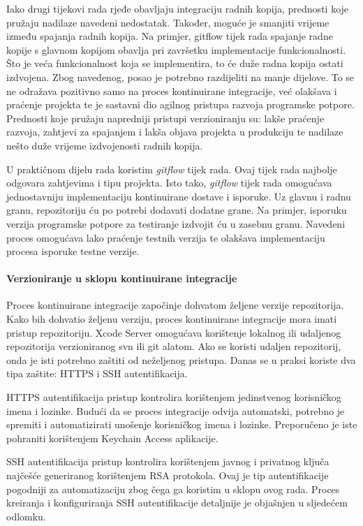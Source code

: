 \documentclass[times, utf8, diplomski, numeric]{fer}
\begin{document}
Iako drugi tijekovi rada rjeđe obavljaju integraciju radnih kopija, prednosti koje pružaju nadilaze navedeni nedostatak. Također, moguće je smanjiti vrijeme između spajanja radnih kopija. Na primjer, gitflow tijek rada spajanje radne kopije s glavnom kopijom obavlja pri završetku implementacije funkcionalnosti. Što je veća funkcionalnost koja se implementira, to će duže radna kopija ostati izdvojena. Zbog navedenog, posao je potrebno razdijeliti na manje dijelove. To se ne odražava pozitivno samo na proces kontinuirane integracije, već olakšava i praćenje projekta te je sastavni dio agilnog pristupa razvoja programske potpore. Prednosti koje pružaju napredniji pristupi verzioniranju su: lakše praćenje razvoja, zahtjevi za spajanjem i lakša objava projekta u produkciju te nadilaze nešto duže vrijeme izdvojenosti radnih kopija.

U praktičnom dijelu rada koristim \textit{gitflow} tijek rada. Ovaj tijek rada najbolje odgovara zahtjevima i tipu projekta. Isto tako, \textit{gitflow} tijek rada omogućava jednostavniju implementaciju kontinuirane dostave i isporuke. Uz glavnu i radnu granu, repozitoriju ću po potrebi dodavati dodatne grane. Na primjer, isporuku verzija programske potpore za testiranje izdvojit ću u zasebnu granu. Navedeni proces omogućava lako praćenje testnih verzija te olakšava implementaciju procesa isporuke testne verzije.

\paragraph{Verzioniranje u sklopu kontinuirane integracije}

Proces kontinuirane integracije započinje dohvatom željene verzije repozitorija. Kako bih dohvatio željenu verziju, proces kontinuirane integracije mora imati pristup repozitoriju. Xcode Server omogućava korištenje lokalnog ili udaljenog repozitorija verzioniranog svn ili git alatom. Ako se koristi udaljen repozitorij, onda je isti potrebno zaštiti od neželjenog pristupa. Danas se u praksi koriste dva tipa zaštite: HTTPS i SSH autentifikacija.

HTTPS autentifikacija pristup kontrolira korištenjem jedinstvenog korisničkog imena i lozinke. Budući da se proces integracije odvija automatski, potrebno je spremiti i automatizirati unošenje korisničkog imena i lozinke. Preporučeno je iste pohraniti korištenjem Keychain Access aplikacije.

SSH autentifikacija pristup kontrolira korištenjem javnog i privatnog ključa najčešće generiranog korištenjem RSA protokola. Ovaj je tip autentifikacije pogodniji za automatizaciju zbog čega ga koristim u sklopu ovog rada. Proces kreiranja i konfiguriranja SSH autentifikacije detaljnije je objašnjen u sljedećem odlomku.
\end{document}
